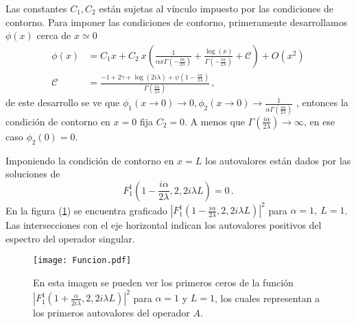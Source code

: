 Las constantes $C_1,C_2$ están sujetas al vínculo impuesto por las condiciones de contorno.
Para imponer las condiciones de contorno, primeramente desarrollamos $\phi (x)$ cerca de $x \simeq 0$ 
\begin{align}
\phi  ( x ) &=
C _1  x  + 
C _2 \ x 
\left( 
\frac{1}{  \alpha x  \Gamma ( - \frac{i \alpha}{2  \lambda}  )   }  +
\frac{\log (x) }{\Gamma ( - \frac{ i \alpha}{2 \lambda} ) } + \mathscr{C} \right) + O(x ^2)
	\nonumber
\\[10pt]
\mathscr{C} &= 
\frac{
-1 + 2 \gamma + \log ( 2  i \lambda ) + \psi (1 - \frac{i \alpha}{2 \lambda})
}
{\Gamma (\frac{i \alpha}{2 \lambda})}
\, ,
\label{eq.scat}
\end{align}
de este desarrollo se ve que $ \phi _1 (x \rightarrow 0 ) \rightarrow 0,\phi _2 (x \rightarrow 0)  \rightarrow
\frac{1}{  \alpha   \Gamma ( \frac{i \alpha}{2 \lambda}  )   } $ , entonces la condición de contorno en $x=0$ fija $C _2 =0$. A menos que $\Gamma ( \frac{i \alpha}{2 \lambda}  ) \rightarrow \infty$, en ese caso $\phi _2 (0) = 0$.


Imponiendo la condición de contorno en $x=L$ los autovalores están dados por las soluciones de
\begin{equation}
F _1 ^1 \left(1-\frac{i \alpha}{2 \lambda},2,2 i \lambda L \right)  = 0
	\, .
\label{eq.1}
\end{equation}
En la figura (\ref{fig:funcion}) se encuentra graficado
\mbox{$ | F _1 ^1 (1-\frac{i \alpha}{2 \lambda},2,2 i \lambda L) | ^2 $} para $\alpha=1, \ L=1$. Las intersecciones con el eje horizontal indican los autovalores positivos del espectro del operador singular.


\begin{figure}[h!]
\centering
\texttt{[image: Funcion.pdf]}
\caption{En esta imagen se pueden ver los primeros ceros de la función $| F _1 ^1 (1+\frac{ \alpha}{2 i \lambda},2,2 i \lambda L) | ^2$ para $\alpha=1$ y $L=1$, los cuales representan a los primeros autovalores del operador $A$.}
\label{fig:funcion}
\end{figure}


